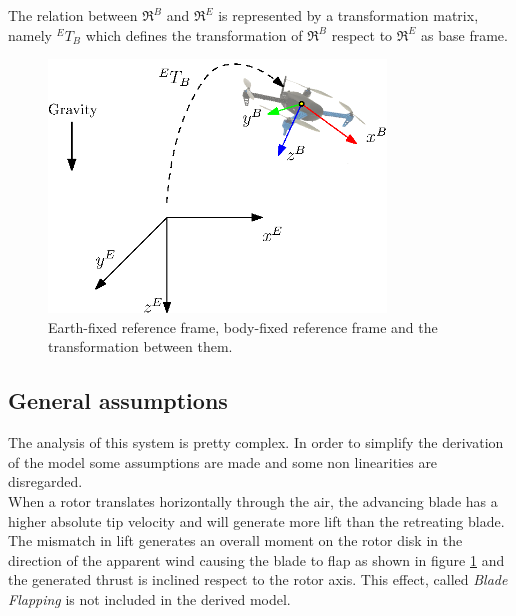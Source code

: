  The relation between $\Re^B$ and $\Re^E$ is represented by a transformation matrix, namely ${}^ET_B$ which defines the transformation of $\Re^B$ respect to $\Re^E$ as base frame.

\begin{figure}[h]
\centering
 \includegraphics[width=0.8\textwidth]{ref_frames.eps}
 \caption[Reference frames for modeling]{Earth-fixed reference frame,  body-fixed reference frame and the transformation between them.}
 \label{figure:refframes}
\end{figure}

\subsection{General assumptions}

The analysis of this system is pretty complex. In order to simplify the derivation of the model some assumptions are made and some non linearities are disregarded. \\ 

\noindent
When a rotor translates horizontally through the air, the advancing blade has a higher absolute tip velocity and will generate more lift than the retreating blade. The mismatch in lift generates an overall moment on the rotor disk in the direction of the apparent wind causing the blade to flap as shown in figure \ref{figure:refframes} and the generated thrust is inclined respect to the rotor axis. This effect, called \textit{Blade Flapping} is not included in the derived model.

